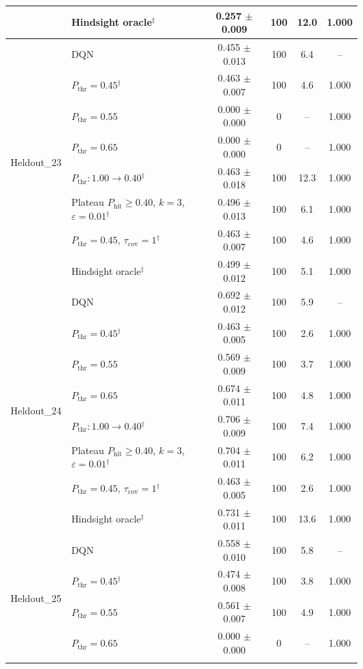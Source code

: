 \begin{table}[htbp]
\begin{tabular}{llcccc}
 & Hindsight oracle$^{\ddagger}$ & 0.257 $\pm$ 0.009 & 100 & 12.0 & 1.000 \\
\midrule
\multirow{8}{*}{Heldout\_23} & DQN & 0.455 $\pm$ 0.013 & 100 & 6.4 & -- \\
 & $P_{\mathrm{thr}}=0.45$$^{\dagger}$ & 0.463 $\pm$ 0.007 & 100 & 4.6 & 1.000 \\
 & $P_{\mathrm{thr}}=0.55$ & 0.000 $\pm$ 0.000 & 0 & -- & 1.000 \\
 & $P_{\mathrm{thr}}=0.65$ & 0.000 $\pm$ 0.000 & 0 & -- & 1.000 \\
 & $P_{\mathrm{thr}}: 1.00 \to 0.40$$^{\dagger}$ & 0.463 $\pm$ 0.018 & 100 & 12.3 & 1.000 \\
 & Plateau $P_{\mathrm{hit}}\geq0.40$, $k=3$, $\varepsilon=0.01$$^{\dagger}$ & 0.496 $\pm$ 0.013 & 100 & 6.1 & 1.000 \\
 & $P_{\mathrm{thr}}=0.45$, $\tau_{\mathrm{cov}}=1$$^{\dagger}$ & 0.463 $\pm$ 0.007 & 100 & 4.6 & 1.000 \\
 & Hindsight oracle$^{\ddagger}$ & 0.499 $\pm$ 0.012 & 100 & 5.1 & 1.000 \\
\midrule
\multirow{8}{*}{Heldout\_24} & DQN & 0.692 $\pm$ 0.012 & 100 & 5.9 & -- \\
 & $P_{\mathrm{thr}}=0.45$$^{\dagger}$ & 0.463 $\pm$ 0.005 & 100 & 2.6 & 1.000 \\
 & $P_{\mathrm{thr}}=0.55$ & 0.569 $\pm$ 0.009 & 100 & 3.7 & 1.000 \\
 & $P_{\mathrm{thr}}=0.65$ & 0.674 $\pm$ 0.011 & 100 & 4.8 & 1.000 \\
 & $P_{\mathrm{thr}}: 1.00 \to 0.40$$^{\dagger}$ & 0.706 $\pm$ 0.009 & 100 & 7.4 & 1.000 \\
 & Plateau $P_{\mathrm{hit}}\geq0.40$, $k=3$, $\varepsilon=0.01$$^{\dagger}$ & 0.704 $\pm$ 0.011 & 100 & 6.2 & 1.000 \\
 & $P_{\mathrm{thr}}=0.45$, $\tau_{\mathrm{cov}}=1$$^{\dagger}$ & 0.463 $\pm$ 0.005 & 100 & 2.6 & 1.000 \\
 & Hindsight oracle$^{\ddagger}$ & 0.731 $\pm$ 0.011 & 100 & 13.6 & 1.000 \\
\midrule
\multirow{8}{*}{Heldout\_25} & DQN & 0.558 $\pm$ 0.010 & 100 & 5.8 & -- \\
 & $P_{\mathrm{thr}}=0.45$$^{\dagger}$ & 0.474 $\pm$ 0.008 & 100 & 3.8 & 1.000 \\
 & $P_{\mathrm{thr}}=0.55$ & 0.561 $\pm$ 0.007 & 100 & 4.9 & 1.000 \\
 & $P_{\mathrm{thr}}=0.65$ & 0.000 $\pm$ 0.000 & 0 & -- & 1.000 \\
$$
\end{tabular}
\end{table}
